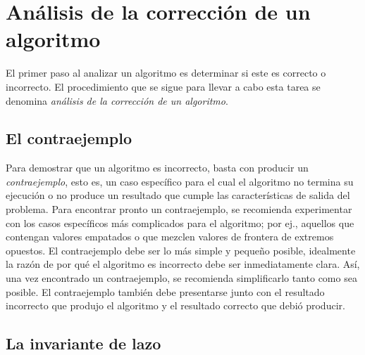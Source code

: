 \chapter{Análisis de la corrección de un algoritmo}

El primer paso al analizar un algoritmo es determinar si este es correcto o incorrecto. 
El procedimiento que se sigue para llevar a cabo esta tarea se denomina \emph{análisis de la corrección de un algoritmo}.

\section{El contraejemplo}

Para  demostrar que un algoritmo es incorrecto, basta con producir un \emph{contraejemplo}, esto es, un caso específico para el cual el algoritmo no termina su ejecución o no produce un resultado que cumple las características de salida del problema. 
Para encontrar pronto un contraejemplo, se recomienda experimentar con los casos específicos más complicados para el algoritmo; por ej., aquellos que contengan valores empatados o que mezclen valores de frontera de extremos opuestos. 
El contraejemplo debe ser lo más simple y pequeño posible, idealmente la razón de por qué el algoritmo es incorrecto debe ser inmediatamente clara. 
Así, una vez encontrado un contraejemplo, se recomienda simplificarlo tanto como sea posible.
El contraejemplo también debe presentarse junto con el resultado incorrecto que produjo el algoritmo y el resultado correcto que debió producir.


\section{La invariante de lazo}

